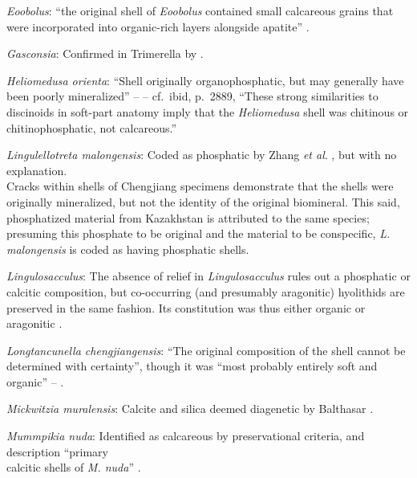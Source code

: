 \documentclass[openany]{book}
\theoremstyle{definition}
\theoremstyle{definition}
\theoremstyle{definition}
\theoremstyle{remark}
\begin{document}
\hypertarget{Eoobolus-coding-55}{}
\emph{Eoobolus}: ``the original shell of \emph{Eoobolus} contained small
calcareous grains that were incorporated into organic-rich layers
alongside apatite'' \citep{Balthasar2007Anearly}.

\hypertarget{Gasconsia-coding-55}{}
\emph{Gasconsia}: Confirmed in Trimerella by
\citet{Balthasar2011Relicaragonite}.

\hypertarget{Heliomedusa_orienta-coding-55}{}
\emph{Heliomedusa orienta}: ``Shell originally organophosphatic, but may
generally have been poorly mineralized'' --
\citet{Williams2007Supplement} -- cf.~ibid, p.~2889, ``These strong
similarities to discinoids in soft-part anatomy imply that the
\emph{Heliomedusa} shell was chitinous or chitinophosphatic, not
calcareous.''

\hypertarget{Lingulellotreta_malongensis-coding-55}{}
\emph{Lingulellotreta malongensis}: Coded as phosphatic by Zhang
\emph{et al}. \citeyearpar{Zhang2014Anearly}, but with no explanation.\\
Cracks within shells of Chengjiang specimens \citep[e.g.][fig.
3]{Zhang2007Noteon} demonstrate that the shells were originally
mineralized, but not the identity of the original biomineral. This said,
phosphatized material from Kazakhstan \citep{Holmer1997EarlyCambrian} is
attributed to the same species; presuming this phosphate to be original
and the material to be conspecific, \emph{L. malongensis} is coded as
having phosphatic shells.

\hypertarget{Lingulosacculus-coding-55}{}
\emph{Lingulosacculus}: The absence of relief in \emph{Lingulosacculus}
rules out a phosphatic or calcitic composition, but co-occurring (and
presumably aragonitic) hyolithids are preserved in the same fashion. Its
constitution was thus either organic or aragonitic
\citep{Balthasar2009EarlyCambrian}.

\hypertarget{Longtancunella_chengjiangensis-coding-55}{}
\emph{Longtancunella chengjiangensis}: ``The original composition of the
shell cannot be determined with certainty'', though it was ``most
probably entirely soft and organic'' --
\citet{Zhang2011Theexceptionally}.

\hypertarget{Mickwitzia_muralensis-coding-55}{}
\emph{Mickwitzia muralensis}: Calcite and silica deemed diagenetic by
Balthasar \citeyearpar{Balthasar2004Shellstructure}.

\hypertarget{Mummpikia_nuda-coding-55}{}
\emph{Mummpikia nuda}: Identified as calcareous by preservational
criteria, and description ``primary\\
calcitic shells of \emph{M. nuda}'' \citep{Balthasar2008iMummpikia}.
\end{document}
